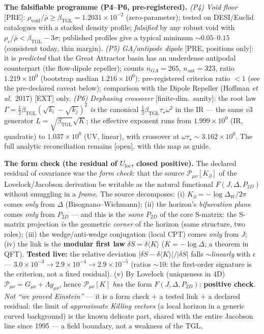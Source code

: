 \documentclass[11pt]{article}
\newcommand{\bTGL}{\beta_{\mathrm{TGL}}}\newcommand{\Msun}{M_{\odot}}\newcommand{\TGL}{\mathrm{TGL}}
\theoremstyle{definition}\newtheorem{deriv}{Derivation}
\begin{document}
\textbf{The falsifiable programme (P4--P6, pre-registered).} \emph{(P4) Void floor} [PRE]: $\rho_{\mathrm{void}}/\bar\rho\ge\bTGL=1.2031\times10^{-2}$ (zero-parameter); tested on DESI/Euclid catalogues with a stacked density profile; \emph{falsified} by any robust void with $\rho_c/\bar\rho<\bTGL-3\sigma$; published profiles give a typical minimum $\sim0.05$--$0.15$ (consistent today, thin margin). \emph{(P5) GA/antipode dipole} [PRE, positions only]: it is \emph{predicted} that the Great Attractor basin has an underdense antipodal counterpart (the flow-dipole repeller); counts $n_{GA}=265$, $n_{\mathrm{ant}}=323$, ratio $1.219\times10^{0}$ (bootstrap median $1.216\times10^{0}$); pre-registered criterion ratio $<1$ (see the pre-declared caveat below); comparison with the Dipole Repeller (Hoffman \emph{et al.}\ 2017) [EXT] only. \emph{(P6) Dephasing crossover} [finite-dim.\ sanity]: the root law $\Gamma=\tfrac12\bTGL(\sqrt{k_i}-\sqrt{k_j})^2$ \emph{is} the canonical $\tfrac12\bTGL\tau_\star\omega^2$ in the IR --- the same $v3$ generator $L=\sqrt{\bTGL}\sqrt{K}$; the effective exponent runs from $1.999\times10^{0}$ (IR, quadratic) to $1.037\times10^{0}$ (UV, linear), with crossover at $\omega\tau_\star\sim3.162\times10^{0}$. The full analytic reconciliation remains [open], with this map as guide.

\textbf{The form check (the residual of $U_{\mathrm{loc}}$, closed positive).} The declared residual of covariance was the \emph{form check}: that the source $\mathcal P_{\mu\nu}[K_\partial]$ of the Lovelock/Jacobson derivation be writable as the natural functional $F(J,\Delta,P_{2D})$ without smuggling in a \emph{frame}. The source decomposes: (i) $K_\partial=-\log\Delta_W/2\pi$ comes \emph{only} from $\Delta$ (Bisognano--Wichmann); (ii) the horizon's \emph{bifurcation plane} comes \emph{only} from $P_{2D}$ --- and this is the \emph{same} $P_{2D}$ of the core S-matrix: the S-matrix projection \emph{is} the geometric \emph{corner} of the horizon (same structure, two roles); (iii) the wedge/anti-wedge conjugation (local CPT) comes \emph{only} from $J$; (iv) the link is the \textbf{modular first law} $\delta S=\delta\langle K\rangle$ ($K=-\log\Delta$; a theorem in QFT). \textbf{Tested live:} the relative deviation $|\delta S-\delta\langle K\rangle|/|\delta S|$ falls $\sim$\emph{linearly} with $\epsilon$ --- $3.0\times10^{-3}\to2.9\times10^{-4}\to2.9\times10^{-5}$ (ratios $\sim10$: the first-order signature is the criterion, not a fixed residual). (v) By Lovelock (uniqueness in 4D) $\mathcal P_{\mu\nu}=G_{\mu\nu}+\Lambda g_{\mu\nu}$, hence $\mathcal P_{\mu\nu}[K]$ \emph{has} the form $F(J,\Delta,P_{2D})$: \textbf{positive check}. \emph{Not ``we proved Einstein''} --- it is a form check $+$ a tested link $+$ a declared residual: the limit of \emph{approximate Killing vectors} (a local horizon in a generic curved background) is the known delicate part, shared with the entire Jacobson line since 1995 --- a field boundary, not a weakness of the $\TGL$.
\end{document}
